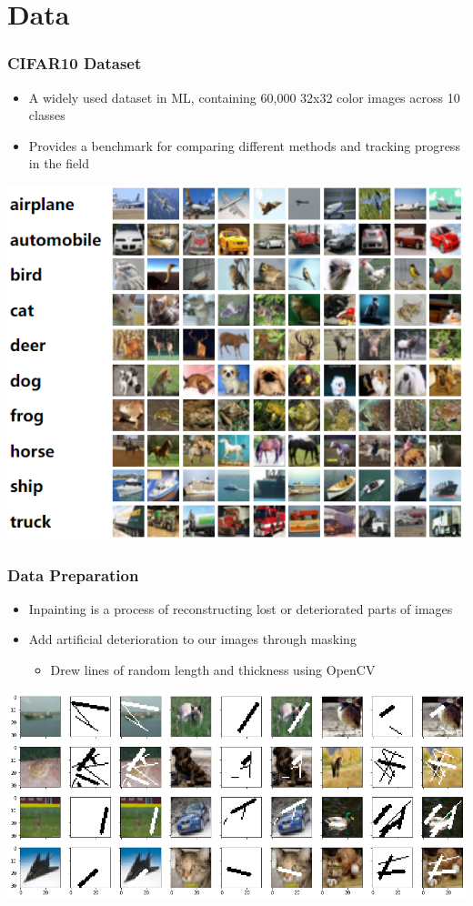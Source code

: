 \documentclass{beamer}
\begin{document}
\section{Data}
\begin{frame}
	\frametitle{CIFAR10 Dataset}
	\begin{itemize}
		\item A widely used dataset in ML, containing 60,000 32x32 color images across 10 classes
		\item Provides a benchmark for comparing different methods and tracking progress in the field
	\end{itemize}
	\begin{center}
		\includegraphics[scale=0.3]{cifar10.png}
	\end{center}
\end{frame}

\begin{frame}
	\frametitle{Data Preparation}
	\begin{itemize}
		\item Inpainting is a process of reconstructing lost or deteriorated parts of images
		\item Add artificial deterioration to our images through masking
		\begin{itemize}
			\item Drew lines of random length and thickness using OpenCV
		\end{itemize}
	\end{itemize}
	\begin{center}
		\includegraphics[scale=0.3]{masks.png}
	\end{center}
\end{frame}
\end{document}
